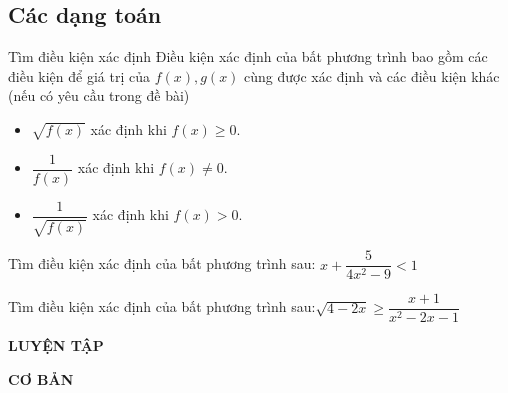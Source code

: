\subsection{Các dạng toán}

\begin{dang}{Tìm điều kiện xác định}
	Điều kiện xác định của bất phương trình bao gồm các điều kiện để giá trị của $f(x),g(x)$ cùng được xác định và các điều kiện khác (nếu có yêu cầu trong đề bài)\\
	\begin{itemize}
		\item $\sqrt{f(x)}$ xác định khi $f(x)\ge 0$.
		\item	$\dfrac{1}{f(x)}$ xác định khi $f(x)\ne 0$.
		\item	$\dfrac{1}{\sqrt{f(x)}}$ xác định khi $f(x)>0$.
	\end{itemize}
\end{dang}

\begin{vd}%
	Tìm điều kiện xác định của bất phương trình sau: $x+\dfrac{5}{4x^2-9}<1$
\end{vd}

\begin{vd}%
	Tìm điều kiện xác định của bất phương trình sau:$\sqrt{4-2x}\ge \dfrac{x+1}{x^2-2x-1}$
\end{vd}
\begin{center}
	\textbf{LUYỆN TẬP}
\end{center}

\noindent \textbf{CƠ BẢN}

